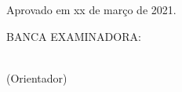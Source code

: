 

% 

\begin{folhadeaprovacao}
  \begin{center}
  {\ABNTEXchapterfont\large\imprimirautor}

  \vspace*{\fill}\vspace*{\fill}
    \begin{center}
    	\ABNTEXchapterfont\bfseries\Large\imprimirtitulo
    \end{center}
  \vspace*{\fill}

  \hspace{.45\textwidth}
    \begin{minipage}{.5\textwidth}
    	\imprimirpreambulo 
    \end{minipage}%

  \vspace*{\fill}
    \begin{flushleft}
  	  Aprovado em xx de março de 2021. \\
    \end{flushleft}
  \vspace*{\fill}
    BANCA EXAMINADORA:%
  \end{center}
   
    \vspace*{\fill} \vspace*{\fill}
    \hspace{.4\textwidth}
    \begin{minipage}{.5\textwidth}
    	\imprimirorientador~\\(Orientador) \\
    \end{minipage}%
    

\end{folhadeaprovacao}
